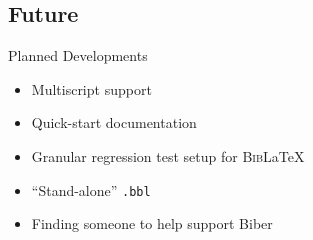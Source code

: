 \documentclass[xcolor=dvipsnames]{beamer}
\def\BibLaTeX{\textsc{Bib}\LaTeX}
\begin{document}
\subsection*{Future}

\begin{frame}{Planned Developments}
  \begin{itemize}
  \item Multiscript support
  \item Quick-start documentation
  \item Granular regression test setup for \BibLaTeX
  \item ``Stand-alone'' \texttt{.bbl}
  \item Finding someone to help support Biber
  \end{itemize}
\end{frame}
\end{document}
